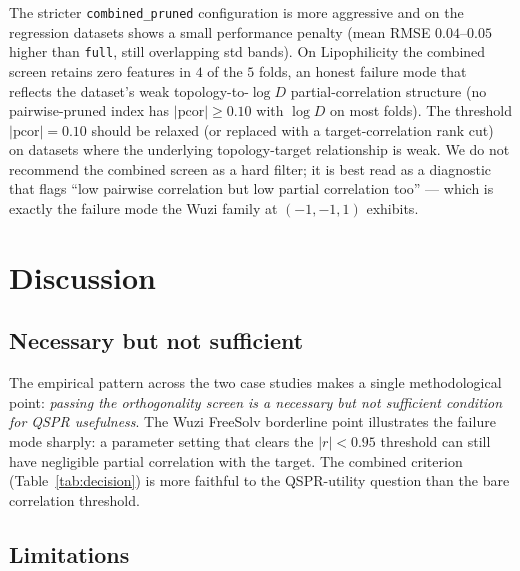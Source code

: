 \documentclass[11pt,a4paper]{article}
\theoremstyle{definition}
\begin{document}
The stricter \texttt{combined\_pruned} configuration is more
aggressive and on the regression datasets shows a small performance
penalty (mean RMSE $0.04$--$0.05$ higher than \texttt{full}, still
overlapping std bands). On Lipophilicity the combined screen
retains zero features in $4$ of the $5$ folds, an honest failure
mode that reflects the dataset's weak topology-to-$\log D$
partial-correlation structure (no pairwise-pruned index has
$|\mathrm{pcor}| \ge 0.10$ with $\log D$ on most folds). The
threshold $|\mathrm{pcor}| = 0.10$ should be relaxed (or replaced
with a target-correlation rank cut) on datasets where the underlying
topology-target relationship is weak. We do not recommend the
combined screen as a hard filter; it is best read as a diagnostic
that flags ``low pairwise correlation but low partial correlation
too'' --- which is exactly the failure mode the Wuzi family at
$(-1,-1,1)$ exhibits.

\section{Discussion}\label{sec:discussion}

\subsection{Necessary but not sufficient}

The empirical pattern across the two case studies makes a single
methodological point: \emph{passing the orthogonality screen is a
necessary but not sufficient condition for QSPR usefulness}. The
Wuzi FreeSolv borderline point illustrates the failure mode
sharply: a parameter setting that clears the $|r|<0.95$
threshold can still have negligible partial correlation with the
target. The combined criterion (Table~\ref{tab:decision}) is more
faithful to the QSPR-utility question than the bare
correlation threshold.

\subsection{Limitations}
\end{document}
